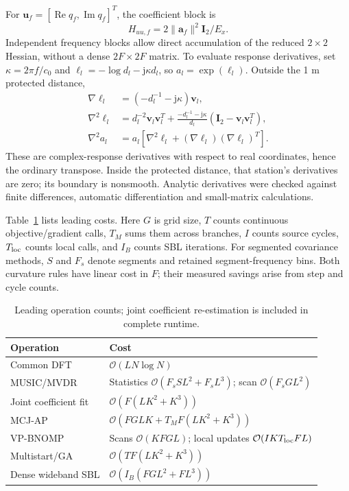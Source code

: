\documentclass[a4paper,fleqn,review]{cas-sc}
\newcommand{\Rea}{\operatorname{Re}}
\begin{document}
For $\bm u_f=[\Rea q_f,\operatorname{Im}q_f]^T$, the coefficient block is
\begin{equation}
H_{uu,f}=2\|\bm a_f\|^2\bm I_2/E_x.
\end{equation}
Independent frequency blocks allow direct accumulation of the reduced $2\times2$ Hessian, without a dense $2F\times2F$ matrix. To evaluate response derivatives, set $\kappa=2\pi f/c_0$ and $\ell_l=-\log d_l-\mathrm j\kappa d_l$, so $a_l=\exp(\ell_l)$. Outside the 1 m protected distance,
\begin{align}
\nabla\ell_l&=(-d_l^{-1}-\mathrm j\kappa)\bm v_l,\\
\nabla^2\ell_l&=d_l^{-2}\bm v_l\bm v_l^T+
\frac{-d_l^{-1}-\mathrm j\kappa}{d_l}(\bm I_2-\bm v_l\bm v_l^T),\\
\nabla^2a_l&=a_l[\nabla^2\ell_l+(\nabla\ell_l)(\nabla\ell_l)^T].
\label{en:responseHessian}
\end{align}
These are complex-response derivatives with respect to real coordinates, hence the ordinary transpose. Inside the protected distance, that station's derivatives are zero; its boundary is nonsmooth. Analytic derivatives were checked against finite differences, automatic differentiation and small-matrix calculations.

Table~\ref{en:complexity} lists leading costs. Here $G$ is grid size, $T$ counts continuous objective/gradient calls, $T_M$ sums them across branches, $I$ counts source cycles, $T_{\rm loc}$ counts local calls, and $I_B$ counts SBL iterations. For segmented covariance methods, $S$ and $F_s$ denote segments and retained segment-frequency bins. Both curvature rules have linear cost in $F$; their measured savings arise from step and cycle counts.
\begin{table}[pos=H]\centering
\caption{Leading operation counts; joint coefficient re-estimation is included in complete runtime.}\label{en:complexity}
\begin{tabularx}{\linewidth}{@{}lX@{}}\toprule
Operation & Cost\\\midrule
Common DFT & $\mathcal O(LN\log N)$\\
MUSIC/MVDR & Statistics $\mathcal O(F_sSL^2+F_sL^3)$; scan $\mathcal O(F_sGL^2)$\\
Joint coefficient fit & $\mathcal O(F(LK^2+K^3))$\\
MCJ-AP & $\mathcal O(FGLK+T_MF(LK^2+K^3))$\\
VP-BNOMP & Scans $\mathcal O(KFGL)$; local updates $\mathcal O(IKT_{\rm loc}FL)$\\
Multistart/GA & $\mathcal O(TF(LK^2+K^3))$\\
Dense wideband SBL & $\mathcal O(I_B(FGL^2+FL^3))$\\\bottomrule
\end{tabularx}\end{table}
\end{document}
